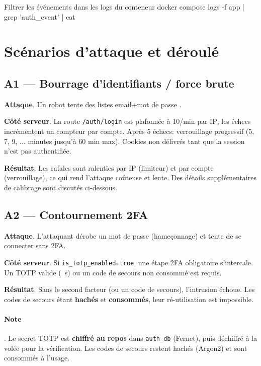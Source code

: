 \begin{codebox}[language=bash]{Filtrer les événements dans les logs du conteneur}
docker compose logs -f app | grep 'auth_event' | cat
\end{codebox}

\section{Scénarios d'attaque et déroulé}

\subsection*{A1 — Bourrage d'identifiants / force brute}
\textbf{Attaque}. Un robot tente des listes \og email+mot de passe \fg{}.

\textbf{Côté serveur}. La route \texttt{/auth/login} est plafonnée à 10/min par IP; les échecs incrémentent un compteur par compte. Après 5 échecs: verrouillage progressif (5, 7, 9, ... minutes jusqu'à 60 min max). Cookies non délivrés tant que la session n'est pas authentifiée.

\textbf{Résultat}. Les rafales sont ralenties par IP (limiteur) et par compte (verrouillage), ce qui rend l'attaque coûteuse et lente. Des détails supplémentaires de calibrage sont discutés ci-dessous.

 

 

\subsection*{A2 — Contournement 2FA}
\textbf{Attaque}. L'attaquant dérobe un mot de passe (hameçonnage) et tente de se connecter sans 2FA.

\textbf{Côté serveur}. Si \texttt{is\_totp\_enabled=true}, une étape 2FA obligatoire s'intercale. Un TOTP valide (~s) ou un code de secours non consommé est requis.

\textbf{Résultat}. Sans le second facteur (ou un code de secours), l'intrusion échoue. Les codes de secours étant \textbf{hachés} et \textbf{consommés}, leur ré-utilisation est impossible.

 

 

\paragraph{Note}. Le secret TOTP est \textbf{chiffré au repos} dans \texttt{auth\_db} (Fernet), puis déchiffré à la volée pour la vérification. Les codes de secours restent hachés (Argon2) et sont consommés à l'usage.

